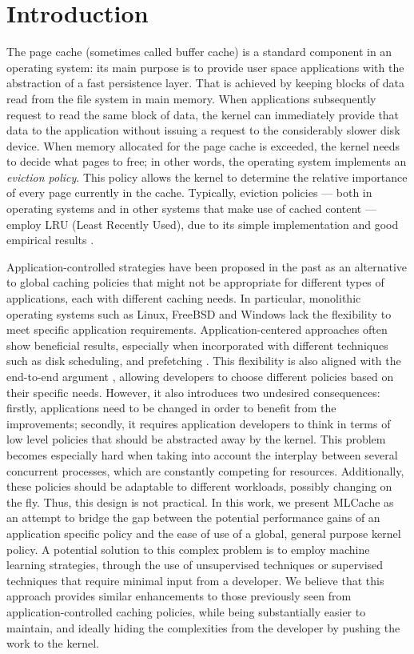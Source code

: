 \section{Introduction}

The page cache (sometimes called buffer cache) is a standard component in an
operating system: its main purpose is to provide user space applications with
the abstraction of a fast persistence layer. That is achieved by keeping blocks
of data read from the file system in main memory. When applications
subsequently request to read the same block of data, the kernel can immediately
provide that data to the application without issuing a request to the
considerably slower disk device. When memory allocated for the page cache is
exceeded, the kernel needs to decide what pages to free; in other words, the
operating system implements an \emph{eviction policy}.  This policy allows the
kernel to determine the relative importance of every page currently in the
cache. Typically, eviction policies --- both in operating systems and in other
systems that make use of cached content --- employ LRU (Least Recently Used),
due to its simple implementation and good empirical results
\cite{Denning:1968}.

Application-controlled strategies have been proposed in the past as an
alternative to global caching policies that might not be appropriate for
different types of applications, each with different caching needs. In
particular, monolithic operating systems such as Linux, FreeBSD and Windows
lack the flexibility to meet specific application requirements.
Application-centered approaches often show beneficial results, especially when
incorporated with different techniques such as disk scheduling, and prefetching
\cite{Cao:1996}. This flexibility is also aligned with the end-to-end argument
\cite{Saltzer:1984}, allowing developers to choose different policies based on
their specific needs. However, it also introduces two undesired consequences:
firstly, applications need to be changed in order to benefit from the
improvements; secondly, it requires application developers to think in terms of
low level policies that should be abstracted away by the kernel.  This problem
becomes especially hard when taking into account the interplay between several
concurrent processes, which are constantly competing for resources.
Additionally, these policies should be adaptable to different workloads,
possibly changing on the fly. Thus, this design is not practical. In this work,
we present MLCache as an attempt to bridge the gap between the potential
performance gains of an application specific policy and the ease of use of a
global, general purpose kernel policy. A potential solution to this complex
problem is to employ machine learning strategies, through the use of
unsupervised techniques or supervised techniques that require minimal input
from a developer. We believe that this approach provides similar enhancements
to those previously seen from application-controlled caching policies, while
being substantially easier to maintain, and ideally hiding the complexities
from the developer by pushing the work to the kernel.
